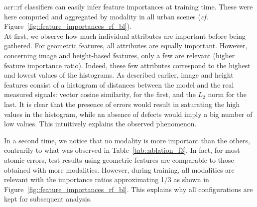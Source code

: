             \gls{acr::rf} classifiers can easily infer feature importances at training time.
            These were here computed and aggregated by modality in all urban scenes (\textit{cf.} Figure~\ref{fig::feature_importances_rf_bl}).\\

            At first, we observe how much individual attributes are important before being gathered.
            For geometric features, all attributes are equally important.
            However, concerning image and height-based features, only a few are relevant (higher feature importance ratio).
            Indeed, these few attributes correspond to the highest and lowest values of the histograms.
            As described earlier, image and height features consist of a histogram of distances between the model and the real measured signals:
            vector cosine similarity, for the first, and the \(L_2\) norm for the last.
            It is clear that the presence of errors would result in saturating the high values in the histogram, while an absence of defects would imply a big number of low values.
            This intuitively explains the observed phenomenon.
            
            In a second time, we notice that no modality is more important than the others, contrarily to what was observed in Table~\ref{tab::ablation_f3}.
            In fact, for most atomic errors, test results using geometric features are comparable to those obtained with more modalities.
            However, during training, all modalities are relevant with the importance ratios approximating 1/3 as shown in Figure~\ref{fig::feature_importances_rf_bl}.
            This explains why all configurations are kept for subsequent analysis.
